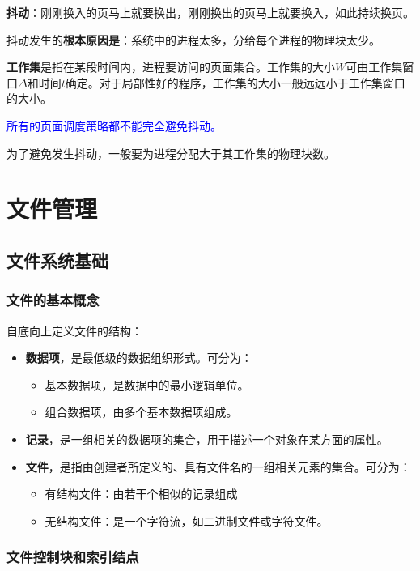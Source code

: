 \documentclass[12pt, a4paper, oneside]{ctexart}
\begin{document}
\textbf{抖动}：刚刚换入的页马上就要换出，刚刚换出的页马上就要换入，如此持续换页。

抖动发生的\textbf{根本原因是}：系统中的进程太多，分给每个进程的物理块太少。

\textbf{工作集}是指在某段时间内，进程要访问的页面集合。工作集的大小$W$可由工作集窗口$\Delta$和时间$t$确定。对于局部性好的程序，工作集的大小一般远远小于工作集窗口的大小。

\textcolor{blue}{所有的页面调度策略都不能完全避免抖动。}

为了避免发生抖动，一般要为进程分配大于其工作集的物理块数。

\section{文件管理}

\subsection{文件系统基础}

\subsubsection{文件的基本概念}

自底向上定义文件的结构：
\begin{itemize}
  \item {\bf 数据项}，是最低级的数据组织形式。可分为：
  \begin{itemize}
    \item 基本数据项，是数据中的最小逻辑单位。
    \item 组合数据项，由多个基本数据项组成。
  \end{itemize}
  \item {\bf 记录}，是一组相关的数据项的集合，用于描述一个对象在某方面的属性。
  \item {\bf 文件}，是指由创建者所定义的、具有文件名的一组相关元素的集合。可分为：
  \begin{itemize}
    \item 有结构文件：由若干个相似的记录组成
    \item 无结构文件：是一个字符流，如二进制文件或字符文件。
  \end{itemize}
\end{itemize}

\subsubsection{文件控制块和索引结点}
\end{document}
